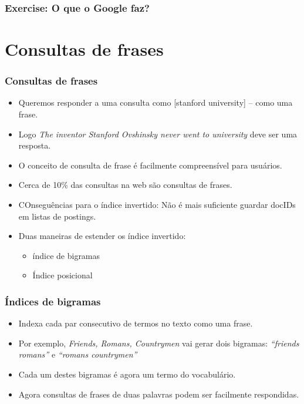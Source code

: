 \documentclass[compress]{beamer}
\begin{document}
\begin{frame}
\frametitle{Exercise: O que o Google faz?}
\end{frame}
\section{Consultas de frases}

\begin{frame}
\frametitle{Consultas de frases}
\begin{itemize}[<+->]
\item Queremos responder a uma consulta como [stanford
  university] -- como uma frase.
\item Logo \emph{The inventor Stanford
  Ovshinsky never went to university}  deve ser uma resposta.
\item O conceito de consulta de frase é facilmente compreensível para 
usuários.
\item Cerca de 10\% das consultas na web são consultas de frases.
\item COnseguências para o índice invertido: Não é mais suficiente guardar 
docIDs  em listas de postings.
\item Duas maneiras de estender os índice invertido:
\begin{itemize}
\item índice de bigramas
\item Índice posicional
\end{itemize}
\end{itemize}
\end{frame}

\begin{frame}
\frametitle{Índices de bigramas}
\begin{itemize}[<+->]
\item Indexa cada par consecutivo de termos no texto como uma frase.
\item Por exemplo, \emph{Friends, Romans, Countrymen} vai gerar dois 
bigramas: \emph{``friends romans''} e 
  \emph{``romans countrymen''}
\item Cada um destes bigramas é agora um termo do vocabulário.
\item Agora consultas de frases de duas palavras podem ser facilmente 
respondidas. 
\end{itemize}
\end{frame}
\end{document}
